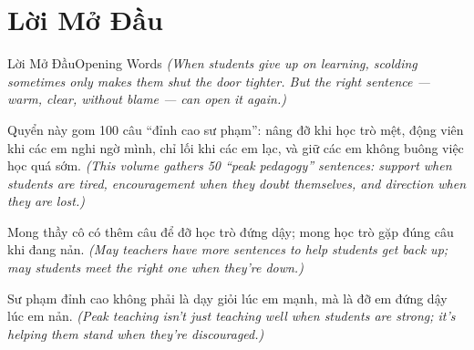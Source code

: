 \chapter*{Lời Mở Đầu}

\begin{truyen}{Lời Mở Đầu}{Opening Words}
\textit{(When students give up on learning, scolding sometimes only makes them shut the door tighter. But the right sentence — warm, clear, without blame — can open it again.)}

Quyển này gom 100 câu ``đỉnh cao sư phạm'': nâng đỡ khi học trò mệt, động viên khi các em nghi ngờ mình, chỉ lối khi các em lạc, và giữ các em không buông việc học quá sớm.
\textit{(This volume gathers 50 ``peak pedagogy'' sentences: support when students are tired, encouragement when they doubt themselves, and direction when they are lost.)}

Mong thầy cô có thêm câu để đỡ học trò đứng dậy; mong học trò gặp đúng câu khi đang nản.
\textit{(May teachers have more sentences to help students get back up; may students meet the right one when they're down.)}
\end{truyen}

\begin{baihoc}
Sư phạm đỉnh cao không phải là dạy giỏi lúc em mạnh, mà là đỡ em đứng dậy lúc em nản.
\textit{(Peak teaching isn't just teaching well when students are strong; it's helping them stand when they're discouraged.)}
\end{baihoc}
\ngancach
